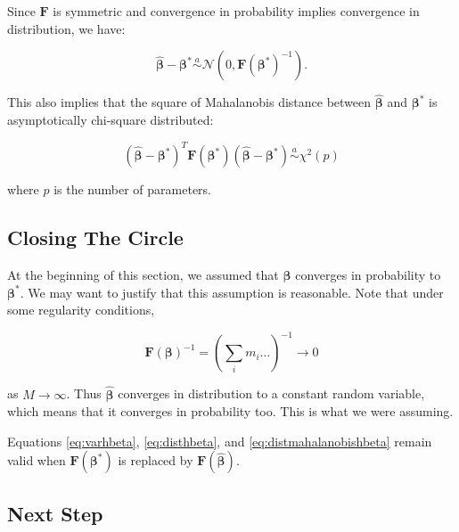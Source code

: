 \documentclass[
  12pt,
]{book}
\begin{document}
Since \(\boldsymbol{F}\) is symmetric and convergence in probability implies convergence in distribution, we have:

\begin{equation}
  \hat{\boldsymbol{\beta}}- \boldsymbol{\beta}^*
  \stackrel{a}{\sim}
  {\mathcal N}(0, \boldsymbol{F}(\boldsymbol{\beta}^*)^{-1}).
  \label{eq:disthbeta}
\end{equation}

This also implies that the square of Mahalanobis distance between \(\hat{\boldsymbol{\beta}}\) and \(\boldsymbol{\beta}^*\) is asymptotically chi-square distributed:

\begin{equation}
  (\hat{\boldsymbol{\beta}}- \boldsymbol{\beta}^*)^{T} \boldsymbol{F}(\boldsymbol{\beta}^*) (\hat{\boldsymbol{\beta}}- \boldsymbol{\beta}^*)
  \stackrel{a}{\sim} \chi^{2}(p)
  \label{eq:distmahalanobishbeta}
\end{equation}

where \(p\) is the number of parameters.

\subsection{Closing The Circle}\label{closing-the-circle}

At the beginning of this section, we assumed that \(\hat{\boldsymbol{\beta}}\) converges in probability to \(\boldsymbol{\beta}^*\). We may want to justify that this assumption is reasonable. Note that under some regularity conditions,

\begin{equation}
  \boldsymbol{F}(\boldsymbol{\beta})^{-1}
  = \left(\sum_{i} m_{i} \ldots \right)^{-1}
  \rightarrow 0
\end{equation}

as \(M\rightarrow\infty\). Thus \(\hat{\boldsymbol{\beta}}\) converges in distribution to a constant random variable, which means that it converges in probability too. This is what we were assuming.

Equations \eqref{eq:varhbeta}, \eqref{eq:disthbeta}, and \eqref{eq:distmahalanobishbeta} remain valid when \(\boldsymbol{F}(\boldsymbol{\beta}^*)\) is replaced by \(\boldsymbol{F}(\hat{\boldsymbol{\beta}})\).

\subsection{Next Step}\label{next-step}
\end{document}
